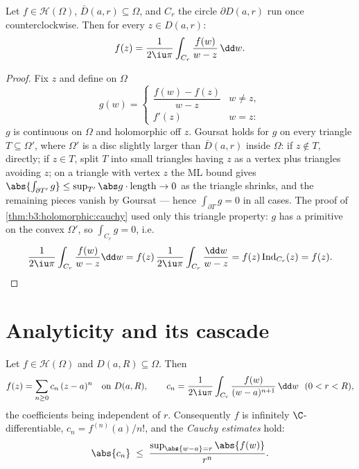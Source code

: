 \begin{theorem}
\label{thm:b3:holomorphic:formula}
Let $f \in \mathcal H(\Omega)$, $\bar D(a, r) \subseteq
\Omega$, and $C_r$ the circle $\partial D(a,r)$ run once
counterclockwise. Then for every $z \in D(a, r)$:
\[
f(z) = \frac1{2\iu\pi}\int_{C_r}\frac{f(w)}{w - z}\,\dd w .
\]
\end{theorem}

\begin{proof}
Fix $z$ and define on $\Omega$
\[
g(w) = \begin{cases}
\dfrac{f(w) - f(z)}{w - z} & w \neq z,\\[4pt]
f'(z) & w = z :
\end{cases}
\]
$g$ is continuous on $\Omega$ and holomorphic off $z$. Goursat
holds for $g$ on every triangle $T \subseteq \Omega'$, where
$\Omega'$ is a disc slightly larger than $\bar D(a,r)$ inside
$\Omega$: if $z \notin T$, directly; if $z \in T$, split $T$
into small triangles having $z$ as a vertex plus triangles
avoiding $z$; on a triangle with vertex $z$ the ML bound gives
$\abs{\int_{\partial T'}g} \leq \sup_{T'}\abs
g\cdot\operatorname{length} \to 0$ as the triangle shrinks,
and the remaining pieces vanish by Goursat --- hence
$\int_{\partial T}g = 0$ in all cases. The proof of
\cref{thm:b3:holomorphic:cauchy} used only this triangle
property: $g$ has a primitive on the convex $\Omega'$, so
$\int_{C_r}g = 0$, i.e.
\[
\frac1{2\iu\pi}\int_{C_r}\frac{f(w)}{w - z}\dd w
= f(z)\,\frac{1}{2\iu\pi}\int_{C_r}\frac{\dd w}{w - z}
= f(z)\operatorname{Ind}_{C_r}(z) = f(z) .
\]
\end{proof}

\section{Analyticity and its cascade}

\begin{theorem}[Holomorphic $=$ analytic]
\label{thm:b3:holomorphic:analytic}
Let $f \in \mathcal H(\Omega)$ and $D(a, R) \subseteq \Omega$.
Then
\[
f(z) = \sum_{n\geq0}c_n\,(z - a)^n \quad \text{on } D(a, R),
\qquad
c_n = \frac1{2\iu\pi}\int_{C_r}\frac{f(w)}{(w -
a)^{n+1}}\,\dd w \ \ (0 < r < R),
\]
the coefficients being independent of $r$. Consequently $f$ is
infinitely $\C$-differentiable, $c_n = f^{(n)}(a)/n!$, and the
\emph{Cauchy estimates} hold:
\[
\abs{c_n} \;\leq\; \frac{\sup_{\abs{w - a} =
r}\abs{f(w)}}{r^{n}} .
\]
\end{theorem}

